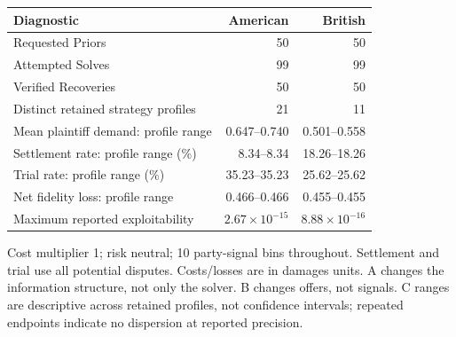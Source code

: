 \noindent\begin{tabularx}{\linewidth}{@{}>{\raggedright\arraybackslash}Xrr@{}}
\toprule
\textbf{Diagnostic} & \textbf{American} & \textbf{British} \\
\midrule
Requested Priors & 50 & 50 \\
Attempted Solves & 99 & 99 \\
Verified Recoveries & 50 & 50 \\
Distinct retained strategy profiles & 21 & 11 \\
Mean plaintiff demand: profile range & 0.647--0.740 & 0.501--0.558 \\
Settlement rate: profile range (\%) & 8.34--8.34 & 18.26--18.26 \\
Trial rate: profile range (\%) & 35.23--35.23 & 25.62--25.62 \\
Net fidelity loss: profile range & 0.466--0.466 & 0.455--0.455 \\
Maximum reported exploitability & $2.67\times10^{-15}$ & $8.88\times10^{-16}$ \\
\bottomrule\end{tabularx}\par\medskip
{\footnotesize\noindent Cost multiplier 1; risk neutral; 10 party-signal bins throughout. Settlement and trial use all potential disputes. Costs/losses are in damages units. A changes the information structure, not only the solver. B changes offers, not signals. C ranges are descriptive across retained profiles, not confidence intervals; repeated endpoints indicate no dispersion at reported precision.\par}
\endgroup
